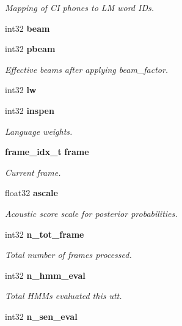 \begin{DoxyCompactItemize}
\begin{DoxyCompactList}\small\item\em Mapping of C\-I phones to L\-M word I\-Ds. \end{DoxyCompactList}\item 
int32 {\bfseries beam}\label{structallphone__search__s_a8d99dcbcf48746431dd1b37c94b4839d}

\item 
int32 {\bf pbeam}\label{structallphone__search__s_af1c69cfc6361bfed4ed0726cbdd4fbfa}

\begin{DoxyCompactList}\small\item\em Effective beams after applying beam\-\_\-factor. \end{DoxyCompactList}\item 
int32 {\bfseries lw}\label{structallphone__search__s_ad2156dcb114cc598b55854ec1f139e81}

\item 
int32 {\bf inspen}\label{structallphone__search__s_ac4f20ffb4acb7c36a8e04cf7b88eafb2}

\begin{DoxyCompactList}\small\item\em Language weights. \end{DoxyCompactList}\item 
{\bf frame\-\_\-idx\-\_\-t} {\bf frame}
\begin{DoxyCompactList}\small\item\em Current frame. \end{DoxyCompactList}\item 
float32 {\bf ascale}
\begin{DoxyCompactList}\small\item\em Acoustic score scale for posterior probabilities. \end{DoxyCompactList}\item 
int32 {\bf n\-\_\-tot\-\_\-frame}\label{structallphone__search__s_a83712f4d89a500720b5bb3e8b2b67297}

\begin{DoxyCompactList}\small\item\em Total number of frames processed. \end{DoxyCompactList}\item 
int32 {\bf n\-\_\-hmm\-\_\-eval}\label{structallphone__search__s_a24d1b4b58c797ff488651b6238040433}

\begin{DoxyCompactList}\small\item\em Total H\-M\-Ms evaluated this utt. \end{DoxyCompactList}\item 
int32 {\bf n\-\_\-sen\-\_\-eval}\label{structallphone__search__s_a5759743790af0ec17f85f14f18004b71}


\end{DoxyCompactItemize}
